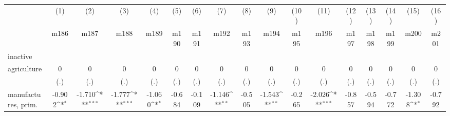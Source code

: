 {
\def\sym#1{\ifmmode^{#1}\else\(^{#1}\)\fi}
\begin{tabular}{l*{16}{c}}
\hline\hline
                    &\multicolumn{1}{c}{(1)}&\multicolumn{1}{c}{(2)}&\multicolumn{1}{c}{(3)}&\multicolumn{1}{c}{(4)}&\multicolumn{1}{c}{(5)}&\multicolumn{1}{c}{(6)}&\multicolumn{1}{c}{(7)}&\multicolumn{1}{c}{(8)}&\multicolumn{1}{c}{(9)}&\multicolumn{1}{c}{(10)}&\multicolumn{1}{c}{(11)}&\multicolumn{1}{c}{(12)}&\multicolumn{1}{c}{(13)}&\multicolumn{1}{c}{(14)}&\multicolumn{1}{c}{(15)}&\multicolumn{1}{c}{(16)}\\
                    &\multicolumn{1}{c}{m186}&\multicolumn{1}{c}{m187}&\multicolumn{1}{c}{m188}&\multicolumn{1}{c}{m189}&\multicolumn{1}{c}{m190}&\multicolumn{1}{c}{m191}&\multicolumn{1}{c}{m192}&\multicolumn{1}{c}{m193}&\multicolumn{1}{c}{m194}&\multicolumn{1}{c}{m195}&\multicolumn{1}{c}{m196}&\multicolumn{1}{c}{m197}&\multicolumn{1}{c}{m198}&\multicolumn{1}{c}{m199}&\multicolumn{1}{c}{m200}&\multicolumn{1}{c}{m201}\\
\hline
inactive            &                     &                     &                     &                     &                     &                     &                     &                     &                     &                     &                     &                     &                     &                     &                     &                     \\
agriculture         &           0         &           0         &           0         &           0         &           0         &           0         &           0         &           0         &           0         &           0         &           0         &           0         &           0         &           0         &           0         &           0         \\
                    &         (.)         &         (.)         &         (.)         &         (.)         &         (.)         &         (.)         &         (.)         &         (.)         &         (.)         &         (.)         &         (.)         &         (.)         &         (.)         &         (.)         &         (.)         &         (.)         \\
[1em]
manufactures, prim. &      -0.902\sym{*}  &      -1.710\sym{***}&      -1.777\sym{***}&      -1.060\sym{*}  &      -0.684         &      -0.109         &      -1.146\sym{**} &      -0.505         &      -1.543\sym{**} &      -0.265         &      -2.026\sym{***}&      -0.857         &      -0.594         &      -0.772         &      -1.308\sym{*}  &      -0.792         \\

\end{tabular}}
